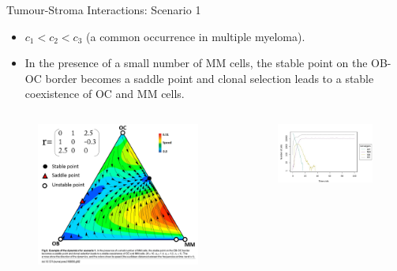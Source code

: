 \begin{frame}{Tumour-Stroma Interactions: Scenario 1}
    \begin{itemize}
        \item $c_1<c_2<c_3$ (a common occurrence in multiple myeloma).
        \item In the presence of a small number of MM cells, the stable point on the OB-OC border becomes a saddle point and clonal selection leads to a stable coexistence of OC and MM cells.
    \end{itemize}
    
    \begin{columns}
        \begin{column}{0.4\textwidth}
            \begin{figure}[t]
                \includegraphics[width=0.9\linewidth]{img/Scenario1.png}
            \end{figure}
        \end{column}
        \begin{column}{0.6\textwidth}
            \begin{figure}[t]
                \includegraphics[width=0.9\linewidth]{img/scenario1_tr.jpg}
            \end{figure}
        \end{column}
    \end{columns}
\end{frame}

